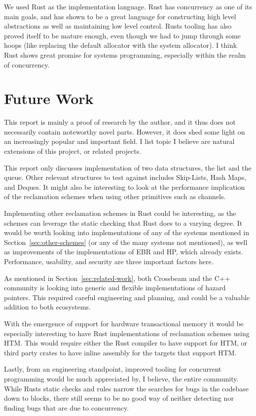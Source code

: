 \documentclass[b5paper]{report}
\begin{document}
We used Rust as the implementation language. Rust has concurrency as one of its
main goals, and has shown to be a great language for constructing high level
abstractions as well as maintaining low level control. Rusts tooling has also
proved itself to be mature enough, even though we had to jump through some hoops
(like replacing the default allocator with the system allocator). I think Rust
shows great promise for systems programming, especially within the realm of
concurrency.


\section{Future Work}

This report is mainly a proof of research by the author, and it thus does not
necessarily contain noteworthy novel parts. However, it does shed some light on
an increasingly popular and important field. I list topic I believe are natural
extensions of this project, or related projects.

This report only discusses implementation of two data structures, the list and
the queue. Other relevant structures to test against includes Skip-Lists,
Hash Maps, and Deques. It might also be interesting to look at the performance
implication of the reclamation schemes when using other primitives such as
channels.

Implementing other reclamation schemes in Rust could be interesting, as the
schemes can leverage the static checking that Rust does to a varying degree.  It
would be worth looking into implementations of any of the systems mentioned in
Section~\ref{sec:other-schemes} (or any of the many systems not mentioned), as
well as improvements of the implementations of EBR and HP, which already exists.
Performance, usability, and security are three important factors here.

As mentioned in Section~\ref{sec:related-work}, both Crossbeam and the C++
community is looking into generic and flexible implementations of hazard
pointers. This required careful engineering and planning, and could be a
valuable addition to both ecosystems.

With the emergence of support for hardware transactional memory it would be
especially interesting to have Rust implementations of reclamation schemes using
HTM\@. This would require either the Rust compiler to have support for HTM, or
third party crates to have inline assembly for the targets that support HTM\@.

Lastly, from an engineering standpoint, improved tooling for concurrent
programming would be much appreciated by, I believe, the entire community. While
Rusts static checks and rules narrow the searches for bugs in the codebase down
to  blocks, there still seems to be no good way of neither
detecting nor finding bugs that are due to concurrency.
\end{document}
